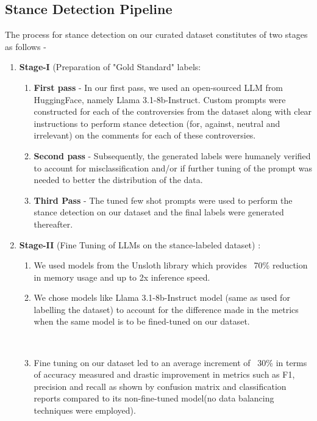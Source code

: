 \documentclass[sigconf, review]{acmart}
\begin{document}
\subsection{Stance Detection Pipeline}
The process for stance detection on our curated dataset constitutes of two stages as follows - 

\begin{enumerate}

\item
    \textbf{Stage-I} (Preparation of "Gold Standard" labels: 
    \begin{enumerate}
        \item \textbf{First pass} - In our first pass, we used an open-sourced LLM from HuggingFace, namely Llama 3.1-8b-Instruct. Custom prompts were constructed for each of the controversies from the dataset along with clear instructions to perform stance detection (for, against, neutral and irrelevant) on the comments for each of these controversies.
        \item \textbf{Second pass} - Subsequently, the generated labels were humanely verified to account for misclassification and/or if further tuning of the prompt was needed to better the distribution of the data.
        \item \textbf{Third Pass} - The tuned few shot prompts were used to perform the stance detection on our dataset and the final labels were generated thereafter.
        
    \end{enumerate}

\item
    \textbf{Stage-II} (Fine Tuning of LLMs on the stance-labeled dataset) : 
    \begin{enumerate}

      \item We used models from the Unsloth library which provides ~70\% reduction in memory usage and up to 2x inference speed.
      \item We chose models like Llama 3.1-8b-Instruct model (same as used for labelling the dataset) to account for the difference made in the metrics when the same model is to be fined-tuned on our dataset.


    \\

    \item Fine tuning on our dataset led to an average increment of ~30\% in terms of accuracy measured and drastic improvement in metrics such as F1, precision and recall as shown by confusion matrix and classification reports compared to its non-fine-tuned model(no data balancing techniques were employed).
    \end{enumerate}

\end{enumerate}
\end{document}
